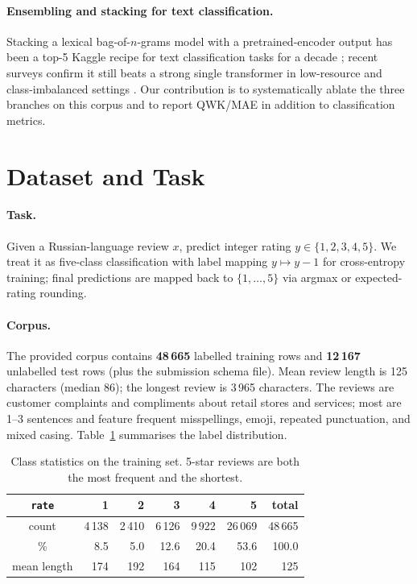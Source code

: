 \documentclass[11pt]{article}
\begin{document}
\paragraph{Ensembling and stacking for text classification.}
Stacking a lexical bag-of-$n$-grams model with a pretrained-encoder output
has been a top-5 Kaggle recipe for text classification tasks for a decade
\citep{wolpert1992stacked,kaggle2019jigsaw}; recent surveys confirm it
still beats a strong single transformer in low-resource and
class-imbalanced settings \citep{howard2023review}. Our contribution is to
systematically ablate the three branches on this corpus and to report
QWK/MAE in addition to classification metrics.

\section{Dataset and Task}
\label{sec:data}

\paragraph{Task.} Given a Russian-language review $x$, predict integer
rating $y \in \{1,2,3,4,5\}$. We treat it as five-class classification with
label mapping $y \mapsto y-1$ for cross-entropy training; final predictions
are mapped back to $\{1,\dots,5\}$ via argmax or expected-rating rounding.

\paragraph{Corpus.} The provided corpus contains
\textbf{48\,665} labelled training rows and \textbf{12\,167} unlabelled test
rows (plus the submission schema file). Mean review length is 125 characters
(median 86); the longest review is 3\,965 characters. The reviews are
customer complaints and compliments about retail stores and services; most
are 1--3 sentences and feature frequent misspellings, emoji, repeated
punctuation, and mixed casing. Table~\ref{tab:classes} summarises the label
distribution.

\begin{table}[t]
  \centering
  \small
  \begin{tabular}{crrrrrr}
    \toprule
    \texttt{rate} & 1 & 2 & 3 & 4 & 5 & total \\
    \midrule
    count          & 4\,138  & 2\,410  & 6\,126  & 9\,922  & 26\,069 & 48\,665 \\
    \%             & 8.5    & 5.0    & 12.6   & 20.4   & 53.6   & 100.0  \\
    mean length    & 174    & 192    & 164    & 115    & 102    & 125    \\
    \bottomrule
  \end{tabular}
  \caption{Class statistics on the training set. 5-star reviews are both the
  most frequent and the shortest.}
  \label{tab:classes}
\end{table}
\end{document}

